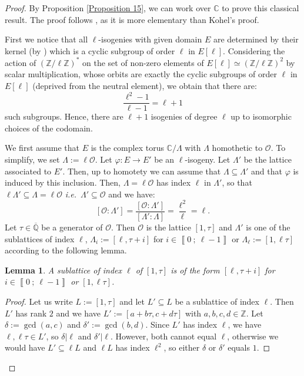 \documentclass[a4paper,10pt,notitlepage]{report}
\theoremstyle{definition}
\theoremstyle{plain}
\newtheorem{Lemma}[Definition]{Lemma}
\theoremstyle{definition}
\newcommand{\ie}{\emph{i.e.}\ }
\newcommand{\Z}{\mathbb{Z}}
\newcommand{\Q}{\mathbb{Q}}
\newcommand{\C}{\mathbb{C}}
\newcommand{\mO}{\mathcal{O}}
\renewcommand{\i}[2]{\left\llbracket #1~;~#2\right\rrbracket}
\renewcommand{\(}{\left(}
\renewcommand{\)}{\right)}
\begin{document}
\begin{proof}
By Proposition \ref{Proposition 15}, we can work over $\C$ to prove this classical result. The proof follows \cite[Theorem 23.5]{MIT}, as it is more elementary than Kohel's proof. 

First we notice that all $\ell$-isogenies with given domain $E$ are determined by their kernel (by \cite[Corollary III.4.11]{Silverman1}) which is a cyclic subgroup of order $\ell$ in $E[\ell]$.  Considering the action of $(\Z/\ell\Z)^*$ on the set of non-zero elements of $E[\ell]\simeq(\Z/\ell\Z)^2$ by scalar multiplication, whose orbits are exactly the cyclic subgroups of order $\ell$ in $E[\ell]$ (deprived from the neutral element), we obtain that there are:
\[\frac{\ell^2-1}{\ell-1}=\ell+1\]
such subgroups. Hence, there are $\ell+1$ isogenies of degree $\ell$ up to isomorphic choices of the codomain.

We first assume that $E$ is the complex torus $\C/\Lambda$ with $\Lambda$ homothetic to $\mO$. To simplify, we set $\Lambda:=\ell\mO$. Let $\varphi: E\longrightarrow E'$ be an $\ell$-isogeny.  Let $\Lambda'$ be the lattice associated to $E'$. Then, up to homotety we can assume that $\Lambda\subseteq \Lambda'$ and that $\varphi$ is induced by this inclusion. Then, $\Lambda=\ell\mO$ has index $\ell$ in $\Lambda'$, so that $\ell\Lambda'\subseteq\Lambda=\ell\mO$ \ie $\Lambda'\subseteq\mO$ and we have: 
\[[\mO:\Lambda']=\frac{[\mO:\Lambda']}{[\Lambda':\Lambda]}=\frac{\ell^2}{\ell}=\ell.\]
Let $\tau\in\overline{\Q}$ be a generator of $\mO$. Then $\mO$ is the lattice $[1,\tau]$ and $\Lambda'$ is one of the sublattices of index $\ell$, $\Lambda_i:=[\ell,\tau+i]$ for $i\in\i{0}{\ell-1}$ or $\Lambda_\ell:=[1,\ell\tau]$ according to the following lemma.

\begin{Lemma}
A sublattice of index $\ell$ of $[1,\tau]$ is of the form $[\ell,\tau+i]$ for $i\in\i{0}{\ell-1}$ or $[1,\ell\tau]$.
\end{Lemma}

\begin{proof}
Let us write $L:=[1,\tau]$ and let $L'\subseteq L$ be a sublattice of index $\ell$. Then $L'$ has rank $2$ and we have $L':=[a+b\tau,c+d\tau]$ with $a,b,c,d\in\Z$.  Let $\delta:=\gcd(a,c)$ and $\delta':=\gcd(b,d)$. Since $L'$ has index $\ell$, we have $\ell,\ell\tau\in L'$, so $\delta|\ell$ and $\delta'|\ell$. However, both cannot equal $\ell$, otherwise we would have $L'\subseteq\ell L$ and $\ell L$ has index $\ell^2$, so either $\delta$ or $\delta'$ equals $1$.  


\end{proof}
\end{proof}
\end{document}
